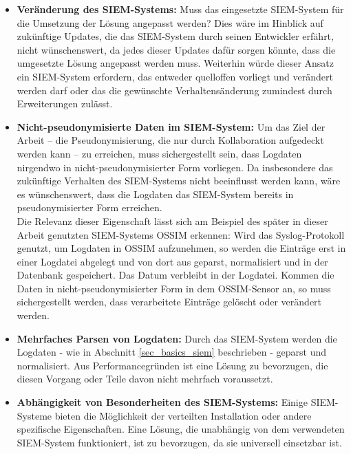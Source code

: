 \begin{itemize}

  \item \textbf{Veränderung des SIEM-Systems: } Muss das eingesetzte SIEM-System für die Umsetzung der Lösung angepasst werden? Dies wäre im Hinblick auf zukünftige Updates, die das SIEM-System durch seinen Entwickler erfährt, nicht wünschenswert, da jedes dieser Updates dafür sorgen könnte, dass die umgesetzte Lösung angepasst werden muss. Weiterhin würde dieser Ansatz ein SIEM-System erfordern, das entweder quelloffen vorliegt und verändert werden darf oder das die gewünschte Verhaltensänderung zumindest durch Erweiterungen zulässt. 
  
  \item \textbf{Nicht-pseudonymisierte Daten im SIEM-System: } Um das Ziel der Arbeit -- die Pseudonymisierung, die nur durch Kollaboration aufgedeckt werden kann -- zu erreichen, muss sichergestellt sein, dass Logdaten nirgendwo in nicht-pseudonymisierter Form vorliegen. Da insbesondere das zukünftige Verhalten des SIEM-Systems nicht beeinflusst werden kann, wäre es wünschenswert, dass die Logdaten das SIEM-System bereits in pseudonymisierter Form erreichen.\\
  Die Relevanz dieser Eigenschaft lässt sich am Beispiel des später in dieser Arbeit genutzten SIEM-Systems OSSIM erkennen: Wird das Syslog-Protokoll genutzt, um Logdaten in OSSIM aufzunehmen, so werden die Einträge erst in einer Logdatei abgelegt und von dort aus geparst, normalisiert und in der Datenbank gespeichert. Das Datum verbleibt in der Logdatei. Kommen die Daten in nicht-pseudonymisierter Form in dem OSSIM-Sensor an, so muss sichergestellt werden, dass verarbeitete Einträge gelöscht oder verändert werden.
  
  \item \textbf{Mehrfaches Parsen von Logdaten: } Durch das SIEM-System werden die Logdaten - wie in Abschnitt \ref{sec_basics_siem} beschrieben - geparst und normalisiert. Aus Performancegründen ist eine Lösung zu bevorzugen, die diesen Vorgang oder Teile davon nicht mehrfach voraussetzt.
  
  \item \textbf{Abhängigkeit von Besonderheiten des SIEM-Systems: } Einige SIEM-Systeme bieten die Möglichkeit der verteilten Installation oder andere spezifische Eigenschaften. Eine Lösung, die unabhängig von dem verwendeten SIEM-System funktioniert, ist zu bevorzugen, da sie universell einsetzbar ist.    
  

\end{itemize}


